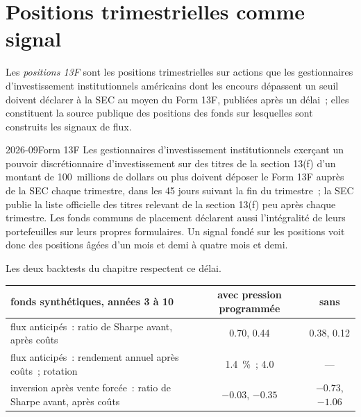 \section{Positions trimestrielles comme signal}

\begin{definition}[Positions 13F]\label{def:s1:flows:13f}
Les \emph{positions 13F} sont les positions trimestrielles sur actions que les gestionnaires d'investissement institutionnels américains dont les encours dépassent un seuil doivent déclarer à
la SEC au moyen du Form 13F, publiées après un délai~; elles constituent la source publique des positions des fonds sur lesquelles sont construits les signaux de flux.
\end{definition}

\begin{dated}{2026-09}{Form 13F}\label{dat:s1:flows:13f}
Les gestionnaires d'investissement institutionnels exerçant un pouvoir discrétionnaire d'investissement sur des titres de la section 13(f) d'un montant de 100~millions de dollars ou plus doivent déposer le Form 13F auprès de la SEC
chaque trimestre, dans les 45 jours suivant la fin du trimestre~; la SEC publie la liste officielle des titres relevant de la section 13(f) peu après chaque trimestre. Les fonds communs
de placement déclarent aussi l'intégralité de leurs portefeuilles sur leurs propres formulaires. Un signal fondé sur les positions voit donc des positions âgées d'un mois et demi à quatre mois et demi.
\end{dated}

Les deux backtests du chapitre respectent ce délai.

\begin{center}
\small
\setlength{\tabcolsep}{4pt}%
\begin{tabular}{@{}lcc@{}}
\toprule
fonds synthétiques, années 3 à 10 & avec pression programmée & sans\\
\midrule
flux anticipés~: ratio de Sharpe avant, après coûts & 0.70, 0.44 & 0.38, 0.12\\
flux anticipés~: rendement annuel après coûts~; rotation & 1.4~\%~; 4.0 & ---\\
inversion après vente forcée~: ratio de Sharpe avant, après coûts & $-0.03$, $-0.35$ & $-0.73$, $-1.06$\\
\bottomrule
\end{tabular}
\end{center}

